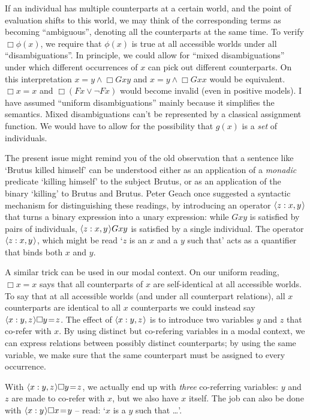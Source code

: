 \documentclass[11pt]{woarticle}
\newcommand{\cmnt}[1]{\iffalse #1 \fi}
\theoremstyle{break}
\theoremstyle{nonumberplain}
\newcommand{\1}{\;\,|\;\,}
\renewcommand{\t}[1]{\ensuremath{\langle #1  \makebox[.2ex]{}\rangle}}
\begin{document}
If an individual has multiple counterparts at a certain world, and the point of
evaluation shifts to this world, we may think of the corresponding terms as
becoming ``ambiguous'', denoting all the counterparts at the same time. To
verify $\Box \phi(x)$, we require that $\phi(x)$ is true at all accessible
worlds under all ``disambiguations''. In principle, we could allow for ``mixed
disambiguations'' under which different occurrences of $x$ can pick out
different counterparts. On this interpretation $x\!=\!y \land \Box Gxy$ and
$x\!=\!y \land \Box Gxx$ would be equivalent. $\Box x\!=\!x$ and
$\Box (Fx \lor \neg Fx)$ would become invalid (even in positive models). I have
assumed ``uniform disambiguations'' mainly because it simplifies the semantics.
Mixed disambiguations can't be represented by a classical assignment function.
We would have to allow for the possibility that $g(x)$ is a \emph{set} of
individuals.

The present issue might remind you of the old observation that a sentence like
`Brutus killed himself' can be understood either as an application of a
\emph{monadic} predicate `killing himself' to the subject Brutus, or as an
application of the binary `killing' to Brutus and Brutus. Peter Geach once
suggested a syntactic mechanism for distinguishing these readings, by
introducing an operator $\t{z:x,y}$ that turns a binary expression into a unary
expression: while $Gxy$ is satisfied by pairs of individuals, $\t{z:x,y}Gxy$ is
satisfied by a single individual. The operator $\t{z:x,y}$, which might be read
`$z$ is an $x$ and a $y$ such that' acts as a quantifier that binds both $x$ and
$y$.

A similar trick can be used in our modal context. On our uniform reading,
$\Box x\!=\!x$ says that all counterparts of $x$ are self-identical at all
accessible worlds. To say that at all accessible worlds (and under all
counterpart relations), all $x$ counterparts are identical to all $x$
counterparts we could instead say $\t{x:y,z}\Box y\!=\!z$. The effect of
$\t{x:y,z}$ is to introduce two variables $y$ and $z$ that co-refer with $x$. By
using distinct but co-refering variables in a modal context, we can express
relations between possibly distinct counterparts; by using the same variable, we
make sure that the same counterpart must be assigned to every occurrence.

With $\t{x:y,z}\Box y\!=\!z$, we actually end up with \emph{three} co-referring
variables: $y$ and $z$ are made to co-refer with $x$, but we also have $x$
itself. The job can also be done with $\t{x:y}\Box x\!=\!y$ -- read: `$x$ is a
$y$ such that \ldots'.%
\cmnt{(See Lowe and Geach.)}
\end{document}

